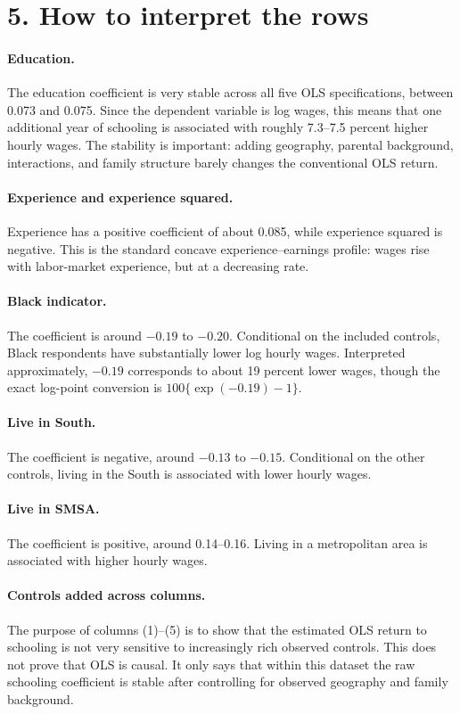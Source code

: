 \documentclass[11pt,a4paper]{article}
\begin{document}
\section*{5. How to interpret the rows}

\paragraph{Education.} The education coefficient is very stable across all five OLS specifications, between 0.073 and 0.075. Since the dependent variable is log wages, this means that one additional year of schooling is associated with roughly 7.3--7.5 percent higher hourly wages. The stability is important: adding geography, parental background, interactions, and family structure barely changes the conventional OLS return.

\paragraph{Experience and experience squared.} Experience has a positive coefficient of about 0.085, while experience squared is negative. This is the standard concave experience--earnings profile: wages rise with labor-market experience, but at a decreasing rate.

\paragraph{Black indicator.} The coefficient is around \(-0.19\) to \(-0.20\). Conditional on the included controls, Black respondents have substantially lower log hourly wages. Interpreted approximately, \(-0.19\) corresponds to about 19 percent lower wages, though the exact log-point conversion is \(100\{\exp(-0.19)-1\}\).

\paragraph{Live in South.} The coefficient is negative, around \(-0.13\) to \(-0.15\). Conditional on the other controls, living in the South is associated with lower hourly wages.

\paragraph{Live in SMSA.} The coefficient is positive, around 0.14--0.16. Living in a metropolitan area is associated with higher hourly wages.

\paragraph{Controls added across columns.} The purpose of columns (1)--(5) is to show that the estimated OLS return to schooling is not very sensitive to increasingly rich observed controls. This does not prove that OLS is causal. It only says that within this dataset the raw schooling coefficient is stable after controlling for observed geography and family background.
\end{document}
